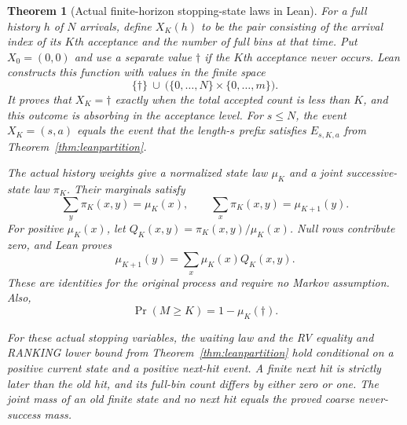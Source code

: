 \documentclass[11pt]{article}
\newtheorem{theorem}{Theorem}
\begin{document}
\begin{theorem}[Actual finite-horizon stopping-state laws in Lean]\label{thm:leanstopping}
For a full history $h$ of $N$ arrivals, define $X_K(h)$ to be the pair
consisting of the arrival index of its $K$th acceptance and the number
of full bins at that time. Put $X_0=(0,0)$ and use a separate value
$\dagger$ if the $K$th acceptance never occurs. Lean constructs this
function with values in the finite space
\[
 \{\dagger\}\ \cup\ \bigl(\{0,\ldots,N\}\times\{0,\ldots,m\}\bigr).
\]
It proves that $X_K=\dagger$ exactly when the total accepted count is
less than $K$, and this outcome is absorbing in the acceptance level.
For $s\leq N$, the event $X_K=(s,a)$ equals the event that the length-$s$
prefix satisfies $E_{s,K,a}$ from Theorem~\ref{thm:leanpartition}.

The actual history weights give a normalized state law $\mu_K$ and a
joint successive-state law $\pi_K$. Their marginals satisfy
\[
 \sum_y\pi_K(x,y)=\mu_K(x),\qquad
 \sum_x\pi_K(x,y)=\mu_{K+1}(y).
\]
For positive $\mu_K(x)$, let $Q_K(x,y)=\pi_K(x,y)/\mu_K(x)$.
Null rows contribute zero, and Lean proves
\[
 \mu_{K+1}(y)=\sum_x\mu_K(x)Q_K(x,y).
\]
These are identities for the original process and require no Markov
assumption. Also,
\[
 \Pr(M\geq K)=1-\mu_K(\dagger).
\]

For these actual stopping variables, the waiting law and the RV equality
and RANKING lower bound from Theorem~\ref{thm:leanpartition} hold
conditional on a positive current state and a positive next-hit event.
A finite next hit is strictly later than the old hit, and its full-bin
count differs by either zero or one. The joint mass of an old finite
state and no next hit equals the proved coarse never-success mass.
\end{theorem}
\end{document}
